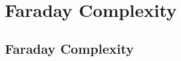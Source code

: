 \chapter{Faraday Complexity}
\label{cha:faraday}

\section{Faraday Complexity}
\label{sec:faraday-complexity}

